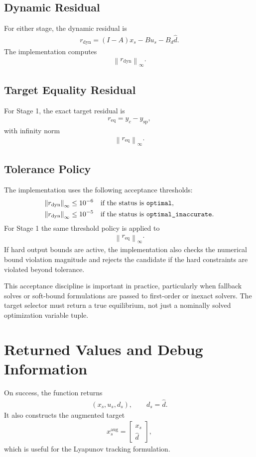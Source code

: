 \documentclass[11pt]{article}
\newcommand{\xs}{x_s}
\newcommand{\us}{u_s}
\newcommand{\ds}{d_s}
\newcommand{\ysp}{y_{\mathrm{sp}}}
\newcommand{\yctrl}{y_c}
\newcommand{\dhat}{\hat d}
\newcommand{\norminf}[1]{\left\lVert #1 \right\rVert_{\infty}}
\begin{document}
\subsection{Dynamic Residual}
For either stage, the dynamic residual is
\begin{align}
    r_{\mathrm{dyn}} = (I-A)\xs - B\us - B_d \dhat.
\end{align}
The implementation computes
\begin{align}
    \norminf{r_{\mathrm{dyn}}}.
\end{align}

\subsection{Target Equality Residual}
For Stage 1, the exact target residual is
\begin{align}
    r_{\mathrm{eq}} = \yctrl - \ysp,
\end{align}
with infinity norm
\begin{align}
    \norminf{r_{\mathrm{eq}}}.
\end{align}

\subsection{Tolerance Policy}
The implementation uses the following acceptance thresholds:
\begin{align}
    \norminf{r_{\mathrm{dyn}}} &\le 10^{-6}
    && \text{if the status is \texttt{optimal}}, \\
    \norminf{r_{\mathrm{dyn}}} &\le 10^{-5}
    && \text{if the status is \texttt{optimal\_inaccurate}}.
\end{align}
For Stage 1 the same threshold policy is applied to
\begin{align}
    \norminf{r_{\mathrm{eq}}}.
\end{align}
If hard output bounds are active, the implementation also checks the numerical
bound violation magnitude and rejects the candidate if the hard constraints are
violated beyond tolerance.

This acceptance discipline is important in practice, particularly when fallback
solves or soft-bound formulations are passed to first-order or inexact solvers.
The target selector must return a true equilibrium, not just a nominally solved
optimization variable tuple.

\section{Returned Values and Debug Information}
On success, the function returns
\begin{align}
    (\xs,\us,\ds),
    \qquad \ds = \dhat.
\end{align}
It also constructs the augmented target
\begin{align}
    x_s^{\mathrm{aug}} =
    \begin{bmatrix}
        \xs \\
        \dhat
    \end{bmatrix},
\end{align}
which is useful for the Lyapunov tracking formulation.
\end{document}
